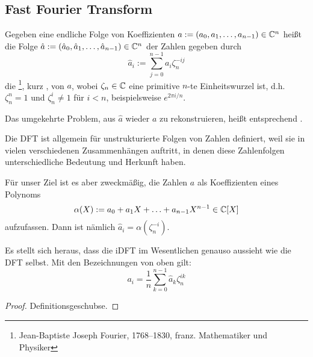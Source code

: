 
\subsection{Fast Fourier Transform}\label{sec:fft}

\begin{definition}[DFT]
    Gegeben eine endliche Folge von Koeffizienten $a:=(a_0,a_1,\ldots,a_{n-1})\in\mathbb{C}^n$ heißt die Folge $\hat{a}:=(\hat{a}_0,\hat{a}_1,\ldots,\hat{a}_{n-1})\in\mathbb{C}^n$ der Zahlen gegeben durch
    \[\hat{a}_i := \sum_{j=0}^{n-1} a_i \zeta_n^{-ij}\]
    die \footnote{Jean-Baptiste Joseph Fourier, 1768--1830, franz. Mathematiker und Physiker}, kurz , von $a$, wobei $\zeta_n\in\mathbb{C}$ eine primitive $n$-te Einheitswurzel ist, d.h. $\zeta_n^n=1$ und $\zeta_n^i \neq 1$ für $i<n$, beispielsweise $e^{2\pi i / n}$.

    \medskip
    Das umgekehrte Problem, aus $\hat{a}$ wieder $a$ zu rekonstruieren, heißt entsprechend .
\end{definition}

\begin{remark}
    Die DFT ist allgemein für unstrukturierte Folgen von Zahlen definiert, weil sie in vielen verschiedenen Zusammenhängen auftritt, in denen diese Zahlenfolgen unterschiedliche Bedeutung und Herkunft haben.

    Für unser Ziel ist es aber zweckmäßig, die Zahlen $a$ als Koeffizienten eines Polynoms
    \[\alpha(X) := a_0 + a_1 X + \ldots + a_{n-1}X^{n-1} \in\mathbb{C}[X]\]
    aufzufassen. Dann ist nämlich $\hat{a}_i = \alpha(\zeta_n^{-i})$.
\end{remark}

\begin{lemma}
    Es stellt sich heraus, dass die iDFT im Wesentlichen genauso aussieht wie die DFT selbst. Mit den Bezeichnungen von oben gilt:
    \[a_i = \frac{1}{n}\sum_{k=0}^{n-1} \hat{a}_k \zeta_n^{ik}\]
\end{lemma}
\begin{proof}
    Definitionsgeschubse.
\end{proof}

